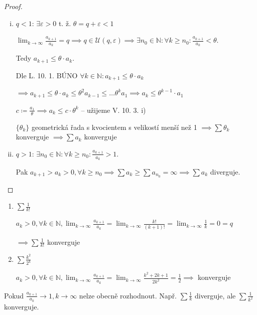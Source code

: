 \begin{proof}
  \begin{enumerate}[i)]
    \item \underline{$q<1$}: $\exists \varepsilon > 0$ t. ž. $\theta = q+\varepsilon<1$

    $\lim_{k\to\infty} \frac{a_{k+1}}{a_k} = q \implies q \in \mathscr U(q, \varepsilon) \implies \exists n_0 \in \mathbb N: \forall k \geq n_0: \frac{a_{k+1}}{a_k}<\theta$.

    Tedy $a_{k+1} \leq \theta \cdot a_k$.

    Dle L. 10. 1. BÚNO $\forall k \in \mathbb N:a_{k+1} \leq \theta \cdot a_k$

    $\implies a_{k+1} \leq \theta\cdot a_k \leq \theta^2 a_{k-1} \leq \dots \theta^k a_1 \implies a_k \leq \theta^{k-1} \cdot a_1$

    $c \coloneq \frac{a_1}{\theta} \implies a_k \leq c \cdot \theta^k$ -- užijeme V. 10. 3. i)

    $\{\theta_k\}$ geometrická řada s kvocientem s velikostí menší než 1 $\implies \sum \theta_k$ konverguje $\implies \sum a_k$ konverguje
    \item \underline{$q>1$}: $\exists n_0 \in \mathbb N: \forall k \geq n_0: \frac{a_{k+1}}{a_k} > 1$.

    Pak $a_{k+1} >a_k >0, \forall k \geq n_0 \implies \sum a_k \geq \sum a_{n_0} = \infty \implies \sum a_k$ diverguje.
  \end{enumerate}
\end{proof}


\begin{priklad}
  \begin{enumerate}[1)]
    \item $\sum \frac{1}{k!}$

    $a_k >0, \forall k \in \mathbb N, \lim_{k\to \infty} \frac{a_{k+1}}{a_k} = \lim_{k\to \infty} \frac{k!}{(k+1)!} = \lim_{k\to\infty} \frac{1}{k} = 0 = q$

    $\implies \sum \frac{1}{k!}$ konverguje
    \item $\sum \frac{k^2}{2^k}$

    $a_k >0, \forall k \in \mathbb N, \lim_{k \to \infty} \frac{a_{k+1}}{a_k} = \lim_{k\to \infty} \frac{k^2+2k+1}{2k^2} = \frac{1}{2} \implies$ konverguje
  \end{enumerate}
\end{priklad}

\begin{poznamka}
  Pokud $\frac{a_{k+1}}{a_k} \to 1, k \to \infty$ nelze obecně rozhodnout. Např. $\sum \frac{1}{k}$ diverguje, ale $\sum \frac{1}{k^2}$ konverguje.
\end{poznamka}

